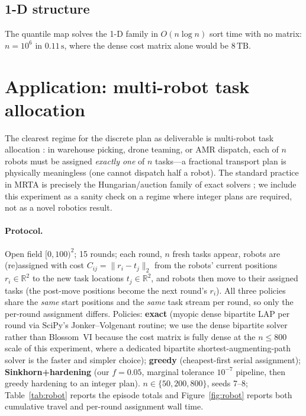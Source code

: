 \documentclass[11pt]{article}
\theoremstyle{remark}
\begin{document}
\subsection{1-D structure}
The quantile map solves the 1-D family in $O(n\log n)$ sort time with no
matrix: $n=10^6$ in $0.11\,\mathrm{s}$, where the dense cost matrix alone
would be $8\,\mathrm{TB}$.

\section{Application: multi-robot task allocation}
\label{sec:app}

The clearest regime for the discrete plan as deliverable is multi-robot
task allocation \cite{gerkey2004}: in warehouse picking, drone teaming, or
AMR dispatch, each of $n$ robots must be assigned \emph{exactly one} of
$n$ tasks---a fractional transport plan is physically meaningless (one
cannot dispatch half a robot). The standard practice in MRTA is precisely
the Hungarian/auction family of exact solvers
\cite{bertsekas1988, jonker1987, gerkey2004}; we include this experiment
as a sanity check on a regime where integer plans are required, not as a
novel robotics result.

\paragraph{Protocol.} Open field $[0,100)^2$; 15 rounds; each round, $n$
fresh tasks appear, robots are (re)assigned with cost
$C_{ij}=\lVert r_i-t_j\rVert_2$ from the robots' current positions
$r_i\in \mathbb{R}^2$ to the new task locations $t_j\in \mathbb{R}^2$, and
robots then move to their assigned tasks (the post-move positions become
the next round's $r_i$). All three policies share the \emph{same} start
positions and the \emph{same} task stream per round, so only the
per-round assignment differs. Policies: \textbf{exact} (myopic dense
bipartite LAP per round via SciPy's Jonker--Volgenant routine; we use the
dense bipartite solver rather than Blossom~VI because the cost matrix is
fully dense at the $n\le 800$ scale of this experiment, where a dedicated
bipartite shortest-augmenting-path solver is the faster and simpler
choice); \textbf{greedy} (cheapest-first serial assignment);
\textbf{Sinkhorn+hardening} (our $f=0.05$, marginal tolerance $10^{-7}$
pipeline, then greedy hardening to an integer plan).
$n\in\{50,200,800\}$, seeds 7--8; Table~\ref{tab:robot} reports the
episode totals and Figure~\ref{fig:robot} reports both cumulative travel
and per-round assignment wall time.
\end{document}
